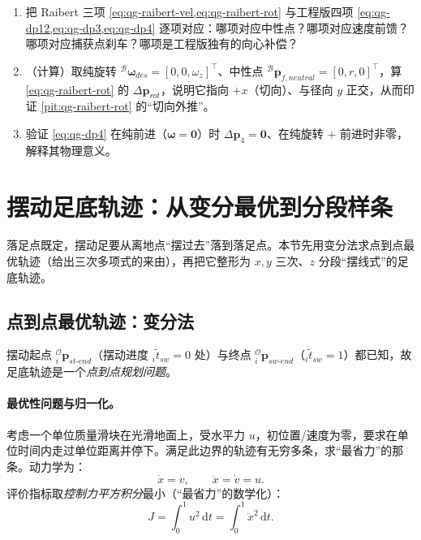 \begin{practice}
\begin{enumerate}
  \item 把 Raibert 三项 \cref{eq:qg-raibert-vel,eq:qg-raibert-rot} 与工程版四项 \cref{eq:qg-dp12,eq:qg-dp3,eq:qg-dp4} 逐项对应：哪项对应中性点？哪项对应速度前馈？哪项对应捕获点刹车？哪项是工程版独有的向心补偿？
  \item （计算）取纯旋转 ${}^{\mathcal{B}}\boldsymbol{\omega}_{des}=[0,0,\omega_z]^\top$、中性点 ${}^{\mathcal{B}}\mathbf{p}_{f,neutral}=[0,r,0]^\top$，算 \cref{eq:qg-raibert-rot} 的 $\Delta\mathbf{p}_{rot}$，说明它指向 $+x$（切向）、与径向 $y$ 正交，从而印证 \cref{pit:qg-raibert-rot} 的“切向外推”。
  \item 验证 \cref{eq:qg-dp4} 在纯前进（$\boldsymbol{\omega}=\mathbf{0}$）时 $\Delta\boldsymbol{p}_4=\mathbf{0}$、在纯旋转 + 前进时非零，解释其物理意义。
\end{enumerate}
\end{practice}

\section{摆动足底轨迹：从变分最优到分段样条}
\label{sec:qg-swing}

落足点既定，摆动足要从离地点“摆过去”落到落足点。本节先用变分法求点到点最优轨迹（给出三次多项式的来由），再把它整形为 $x,y$ 三次、$z$ 分段“摆线式”的足底轨迹。

\subsection{点到点最优轨迹：变分法}
\label{subsec:qg-variational}

摆动起点 ${}_i^{\mathcal{O}}\boldsymbol{p}_{st\text{-}end}$（摆动进度 ${}_i\tilde t_{sw}=0$ 处）与终点 ${}_i^{\mathcal{O}}\boldsymbol{p}_{sw\text{-}end}$（${}_i\tilde t_{sw}=1$）都已知，故足底轨迹是一个\emph{点到点规划问题}\cite{yu2021quadruped}。

\paragraph{最优性问题与归一化。}
考虑一个单位质量滑块在光滑地面上，受水平力 $u$，初位置/速度为零，要求在单位时间内走过单位距离并停下。满足此边界的轨迹有无穷多条，求“最省力”的那条。动力学为\cite{yu2021quadruped}：
\begin{equation}
  \dot x=v,\qquad \ddot x=\dot v=u.
  \label{eq:qg-dyn}
\end{equation}
评价指标取\emph{控制力平方积分}最小（“最省力”的数学化）\cite{yu2021quadruped}：
\begin{equation}
  J=\int_0^1 u^2\,\mathrm{d}t=\int_0^1\ddot x^2\,\mathrm{d}t.
  \label{eq:qg-cost}
\end{equation}

